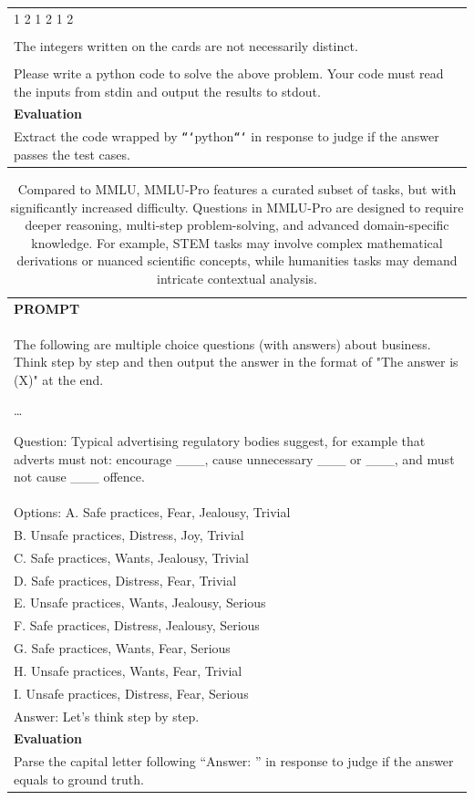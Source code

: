 \begin{table}[h]
\begin{tabular}{p{}}
1 2 1 2 1 2\\
\\
The integers written on the cards are not necessarily distinct.\\
\\
Please write a python code to solve the above problem. Your code must read the inputs from stdin and output the results to stdout.\\ \hline
      \textbf{Evaluation}\\
      Extract the code wrapped by \texttt{```}python\texttt{```} in response to judge if the answer passes the test cases. \\ \hline
    \end{tabular}
\end{table}

\begin{table}[h]
    \centering \small
        \caption{Compared to MMLU, MMLU-Pro features a curated subset of tasks, but with significantly increased difficulty. Questions in MMLU-Pro are designed to require deeper reasoning, multi-step problem-solving, and advanced domain-specific knowledge. For example, STEM tasks may involve complex mathematical derivations or nuanced scientific concepts, while humanities tasks may demand intricate contextual analysis. }
    \label{tab:mmlu-pro}
    \begin{tabular}{p{}}
    \hline
    \textbf{PROMPT}\\
    The following are multiple choice questions (with answers) about business. Think step by step and then output the answer in the format of "The answer is (X)" at the end.

\ldots

Question: Typical advertising regulatory bodies suggest, for example that adverts must not: encourage \_\_\_, cause unnecessary \_\_\_ or \_\_\_, and must not cause \_\_\_ offence. \\
Options: A. Safe practices, Fear, Jealousy, Trivial \\
B. Unsafe practices, Distress, Joy, Trivial \\
C. Safe practices, Wants, Jealousy, Trivial \\
D. Safe practices, Distress, Fear, Trivial \\
E. Unsafe practices, Wants, Jealousy, Serious \\
F. Safe practices, Distress, Jealousy, Serious \\
G. Safe practices, Wants, Fear, Serious \\
H. Unsafe practices, Wants, Fear, Trivial \\
I. Unsafe practices, Distress, Fear, Serious \\
Answer: Let's think step by step.\\ \hline
      \textbf{Evaluation}\\
      Parse the capital letter following ``Answer: '' in response to judge if the answer equals to ground truth. \\ \hline
    \end{tabular}
\end{table}

